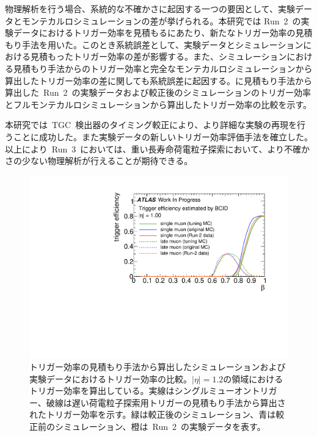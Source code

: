 物理解析を行う場合、系統的な不確かさに起因する一つの要因として、実験データとモンテカルロシミュレーションの差が挙げられる。本研究では Run~2~の実験データにおけるトリガー効率を見積もるにあたり、新たなトリガー効率の見積もり手法を用いた。このとき系統誤差として、実験データとシミュレーションにおける見積もったトリガー効率の差が影響する。また、シミュレーションにおける見積もり手法からのトリガー効率と完全なモンテカルロシミュレーションから算出したトリガー効率の差に関しても系統誤差に起因する。に見積もり手法から算出した~Run~2~の実験データおよび較正後のシミュレーションのトリガー効率とフルモンテカルロシミュレーションから算出したトリガー効率の比較を示す。

本研究では~TGC~検出器のタイミング較正により、より詳細な実験の再現を行うことに成功した。また実験データの新しいトリガー効率評価手法を確立した。以上により~Run~3~においては、重い長寿命荷電粒子探索において、より不確かさの少ない物理解析が行えることが期待できる。

\begin{figure}[H]
    \centering   
    \includegraphics[width=\textwidth,page=4]{img/rec/est_eff.pdf}
    \caption[トリガー効率の見積もり手法から算出したシミュレーションおよび実験データにおけるトリガー効率の比較]{トリガー効率の見積もり手法から算出したシミュレーションおよび実験データにおけるトリガー効率の比較。$|\eta|=1.2$の領域におけるトリガー効率を算出している。実線はシングルミューオントリガー、破線は遅い荷電粒子探索用トリガーの見積もり手法から算出されたトリガー効率を示す。緑は較正後のシミュレーション、青は較正前のシミュレーション、橙は~Run~2~の実験データを表す。}\label{fig:rectri}
\end{figure}

